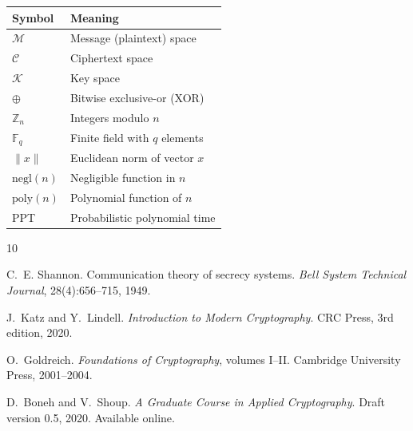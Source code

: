 \documentclass[12pt,a4paper,openany]{book}
\theoremstyle{definition}
\theoremstyle{plain}
\begin{document}
\begin{tabularx}{\textwidth}{@{}lX@{}}
\toprule
\textbf{Symbol} & \textbf{Meaning} \\
\midrule
$\mathcal{M}$ & Message (plaintext) space \\
$\mathcal{C}$ & Ciphertext space \\
$\mathcal{K}$ & Key space \\
$\oplus$ & Bitwise exclusive-or (XOR) \\
$\mathbb{Z}_n$ & Integers modulo $n$ \\
$\mathbb{F}_q$ & Finite field with $q$ elements \\
$\|x\|$ & Euclidean norm of vector $x$ \\
$\text{negl}(n)$ & Negligible function in $n$ \\
$\text{poly}(n)$ & Polynomial function of $n$ \\
PPT & Probabilistic polynomial time \\
\bottomrule
\end{tabularx}

\begin{thebibliography}{10}

C.~E. Shannon.
\newblock Communication theory of secrecy systems.
\newblock \textit{Bell System Technical Journal}, 28(4):656--715, 1949.

J.~Katz and Y.~Lindell.
\newblock \textit{Introduction to Modern Cryptography}.
\newblock CRC Press, 3rd edition, 2020.

O.~Goldreich.
\newblock \textit{Foundations of Cryptography}, volumes I--II.
\newblock Cambridge University Press, 2001--2004.

D.~Boneh and V.~Shoup.
\newblock \textit{A Graduate Course in Applied Cryptography}.
\newblock Draft version 0.5, 2020. Available online.

\end{thebibliography}
\end{document}
